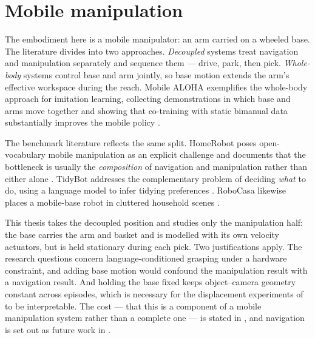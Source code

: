 \section{Mobile manipulation}
\label{sec:bg-mobile}
The embodiment here is a mobile manipulator: an arm carried on a wheeled base. The
literature divides into two approaches. \emph{Decoupled} systems treat navigation and
manipulation separately and sequence them --- drive, park, then pick. \emph{Whole-body}
systems control base and arm jointly, so base motion extends the arm's effective
workspace during the reach. Mobile ALOHA exemplifies the whole-body approach for
imitation learning, collecting demonstrations in which base and arms move together and
showing that co-training with static bimanual data substantially improves the mobile
policy \parencite{fu2024mobilealoha}.

The benchmark literature reflects the same split. HomeRobot poses open-vocabulary mobile
manipulation as an explicit challenge and documents that the bottleneck is usually the
\emph{composition} of navigation and manipulation rather than either alone
\parencite{yenamandra2023homerobot}. TidyBot addresses the complementary problem of
deciding \emph{what} to do, using a language model to infer tidying preferences
\parencite{wu2023tidybot}. RoboCasa likewise places a mobile-base robot in cluttered
household scenes \parencite{nasiriany2024robocasa}.

This thesis takes the decoupled position and studies only the manipulation half: the
base carries the arm and basket and is modelled with its own velocity actuators, but is
held stationary during each pick. Two justifications apply. The research questions
concern language-conditioned grasping under a hardware constraint, and adding base
motion would confound the manipulation result with a navigation result. And holding the
base fixed keeps object--camera geometry constant across episodes, which is necessary
for the displacement experiments of  to be interpretable. The
cost --- that this is a component of a mobile manipulation system rather than a complete
one --- is stated in , and navigation is set out as future work
in .

